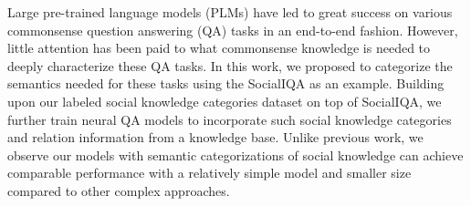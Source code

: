Large pre-trained language models (PLMs) have led to great success on various commonsense question answering (QA) tasks in an end-to-end fashion. However, little attention has been paid to what commonsense knowledge is needed to deeply characterize these QA tasks. In this work, we proposed to categorize the semantics needed for these tasks using the SocialIQA as an example. Building upon our labeled social knowledge categories dataset on top of SocialIQA, we further train neural QA models to incorporate such social knowledge categories and relation information from a knowledge base. Unlike previous work, we observe our models with semantic categorizations of social knowledge can achieve comparable performance with a relatively simple model and smaller size compared to other complex approaches.
